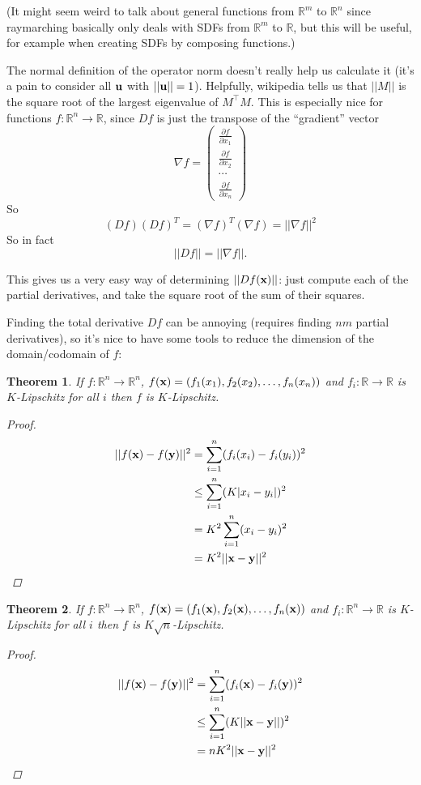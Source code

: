 \documentclass{article}
\newcommand\bb\mathbb
\renewcommand\vec\textbf
\newtheorem{theorem}{Theorem}
\newcommand\pp[2]{\frac{\partial #1}{\partial #2}}
\newcommand\transpose{^\top}
\begin{document}
(It might seem weird to talk about general functions from $\bb R^m$ to $\bb R^n$ since
raymarching basically only deals with SDFs from $\bb R^m$ to $\bb R$, but this will be useful,
for example when creating SDFs by composing functions.)

The normal definition of the operator norm doesn't really help us calculate it (it's a pain
to consider all $\vec u$ with $||\vec u|| = 1$). Helpfully, wikipedia tells us that
$||M||$ is the square root of the largest eigenvalue of $M\transpose M$.
This is especially nice for functions $f:\bb R^n\to \bb R$, since $Df$ is just the transpose of the ``gradient''
vector
$$\nabla f = \begin{pmatrix}
\pp f{x_1}\\ \pp f{x_2}\\\cdots\\\pp f{x_n}
\end{pmatrix}$$
So
$$(Df)(Df)^T = (\nabla f)^T(\nabla f) = ||\nabla f||^2$$
So in fact
$$||Df|| = ||\nabla f||.$$

This gives us a very easy way of determining $||Df(\vec x)||$: just compute each of the
partial derivatives, and take the square root of the sum of their squares.

Finding the total derivative $Df$ can be annoying (requires finding $nm$ partial derivatives),
so it's nice to have some tools to reduce the dimension of the domain/codomain of $f$:
\begin{theorem}
\label{component-wise}
If $f:\bb R^n\to\bb R^n$, $f(\vec x) = (f_1(x_1) , f_2(x_2), \dots, f_n(x_n))$
and $f_i:\bb R\to\bb R$ is $K$-Lipschitz for all $i$ then $f$ is $K$-Lipschitz.
\begin{proof}
\begin{align*}
||f(\vec x) - f(\vec y)||^2 &= \sum_{i=1}^n (f_i(x_i) - f_i(y_i))^2\\
&\leq \sum_{i=1}^n (K|x_i - y_i|)^2\\
&= K^2\sum_{i=1}^n (x_i - y_i)^2\\
&= K^2||\vec x - \vec y||^2
\end{align*}
\end{proof}
\end{theorem}

\begin{theorem}
\label{multiplex}
If $f:\bb R^n\to\bb R^n$, $f(\vec x) = (f_1(\vec x) , f_2(\vec x), \dots, f_n(\vec x))$
and $f_i:\bb R^n\to\bb R$ is $K$-Lipschitz for all $i$ then $f$ is $K\sqrt{n}$-Lipschitz.
\begin{proof}
\begin{align*}
||f(\vec x) - f(\vec y)||^2 &= \sum_{i=1}^n (f_i(\vec x) - f_i(\vec y))^2\\
&\leq \sum_{i=1}^n (K||\vec x-\vec y||)^2\\
&= nK^2||\vec x-\vec y||^2
\end{align*}
\end{proof}
\end{theorem}
\end{document}
